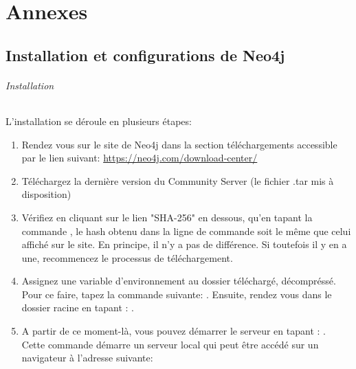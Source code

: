 \documentclass[12pt,twoside, openright]{memoir}
\newcommand{\courrier}[1]{{\fontfamily{qcr}\selectfont {#1}}}
\begin{document}
	{\color{partred}\part*{Annexes}}
	\begin{appendices}
		\chapter{Installation et configurations de Neo4j}
		\label{annex:A}
		\paragraph*{Installation}
		L'installation se déroule en plusieurs étapes:
		\begin{enumerate}
			\item Rendez vous sur le site de Neo4j dans la section téléchargements accessible par le lien suivant: \url{https://neo4j.com/download-center/}
			\item Téléchargez la dernière version du Community Server (le fichier .tar mis à disposition)
			\item Vérifiez en cliquant sur le lien "SHA-256" en dessous, qu'en tapant la commande \courrier{shasum -a 256 neo4j-community-3.5.5-unix.tar.gz}, le hash obtenu dans la ligne de commande soit le même que celui affiché sur le site. En principe, il n'y a pas de différence. Si toutefois il y en a une, recommencez le processus de téléchargement.
			\item Assignez une variable d'environnement au dossier téléchargé, décompréssé. Pour ce faire, tapez la commande suivante: \courrier{NEO4J_HOME=neo4j-community-3.5.5}. Ensuite, rendez vous dans le dossier racine en tapant : \courrier{cd \$NEO4J_HOME}.
			\item A partir de ce moment-là, vous pouvez démarrer le serveur en tapant : \courrier{./bin/neo4j console}. Cette commande démarre un serveur local qui peut être accédé sur un navigateur à l'adresse suivante: \courrier{http://localhost:7474/browser}
		\end{enumerate}

\end{appendices}
\end{document}

